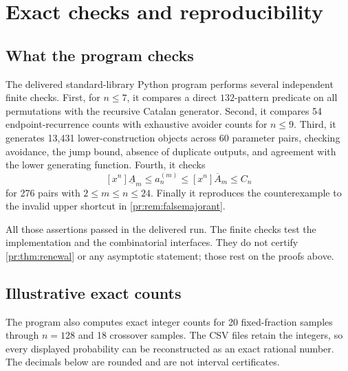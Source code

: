 \documentclass[11pt,a4paper]{article}
\theoremstyle{definition}\newaliascnt{definition}{theorem}
\theoremstyle{remark}\newaliascnt{remark}{theorem}
\begin{document}
\section{Exact checks and reproducibility}
\label{pr:sec:checks}

\subsection{What the program checks}
The delivered standard-library Python program
 performs several independent
finite checks. First, for $n\le7$, it compares a direct $132$-pattern
predicate on all permutations with the recursive Catalan generator. Second,
it compares 54 endpoint-recurrence counts with exhaustive avoider counts for
$n\le9$. Third, it generates 13,431 lower-construction objects across 60
parameter pairs, checking avoidance, the jump bound, absence of duplicate
outputs, and agreement with the lower generating function. Fourth, it checks
\[
 [x^n]\underline A_m\le a_n^{(m)}\le[x^n]\overline A_m\le C_n
\]
for 276 pairs with $2\le m\le n\le24$. Finally it reproduces the
counterexample to the invalid upper shortcut in
\cref{pr:rem:falsemajorant}.

All those assertions passed in the delivered run. The finite checks test the
implementation and the combinatorial interfaces. They do not certify
\cref{pr:thm:renewal} or any asymptotic statement; those rest on the proofs
above.

\subsection{Illustrative exact counts}
The program also computes exact integer counts for 20 fixed-fraction samples
through $n=128$ and 18 crossover samples. The CSV files retain the integers,
so every displayed probability can be reconstructed as an exact rational
number. The decimals below are rounded and are not interval certificates.
\end{document}
